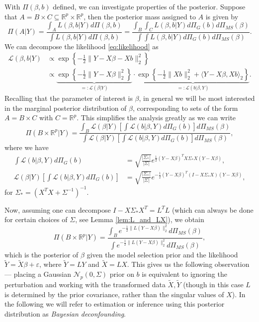 \documentclass[11pt]{article}
\newcommand{\eps}{\varepsilon}
\newcommand{\R}{\mathbb{R}}
\newcommand{\Pims}{\Pi_{MS}}
\newcommand{\Pig}{\Pi_{G}}
\newcommand{\Li}{\mathcal{L}}
\newcommand{\postCov}{\Sigma_*}
\numberwithin{equation}{section}
\begin{document}
With $\Pi(\beta, b)$ defined, we can investigate properties of the posterior. Suppose that $A = B \times C \subseteq \R^{p} \times \R^{p}$, then the posterior mass assigned to $A$ is given by
$$
\Pi(A | Y) = \frac{\int_A L(\beta, b | Y) d\Pi(\beta, b) }{\int L(\beta, b | Y) d\Pi(\beta, b)} = \frac{\int_B \int_C L(\beta, b | Y) d\Pig(b) d\Pims(\beta) }{\int \int L(\beta, b | Y) d\Pig(b) d\Pims(\beta)}.
$$
We can decompose the likelihood \eqref{eq:likelihood} as
\begin{align*}
 \Li (\beta, b | Y) &\propto \exp\left\{-\frac{1}{2}\|Y - X\beta - Xb\|_2^2\right\} \\
	&\propto \underbrace{\exp\left\{-\frac{1}{2}\|Y - X\beta \|_2^2\right\}}_{=: \Li(\beta | Y)}\cdot \underbrace{\exp\left\{-\frac{1}{2}\|Xb\|_2^2 + \langle Y - X\beta, Xb\rangle_2 \right\}}_{=: \Li(b | \beta, Y)}. 
\end{align*}
Recalling that the parameter of interest is $\beta$, in general we will be most interested in the marginal posterior distribution of $\beta$, corresponding to sets of the form $A = B \times C$ with $C = \R^p$. This simplifies the analysis greatly as we can write
$$
\Pi(B \times \R^p | Y) = \frac{\int_B \Li(\beta | Y)\left[\int \Li(b |\beta, Y) d\Pig(b)\right] d\Pims(\beta) }{\int \Li(\beta | Y)\left[\int \Li(b |\beta, Y) d\Pig(b)\right] d\Pims(\beta) },
$$
where we have
\begin{align*}
\int \Li(b |\beta, Y) d\Pig(b) &= \sqrt{\frac{|\postCov|}{|\Sigma|}} e^{\frac{1}{2}(Y - X\beta)^TX\postCov X(Y - X\beta)}, \\	
 \Li(\beta | Y)\left[\int \Li(b |\beta, Y) d\Pig(b)\right] &= \sqrt{\frac{|\postCov|}{|\Sigma|}} e^{-\frac{1}{2}(Y - X\beta)^T(I-X\postCov X)(Y - X\beta)},
\end{align*}
for 
$
\postCov = (X^TX + \Sigma^{-1})^{-1}.
$

 Now, assuming one can decompose $I - X\postCov X^T = L^TL$ (which can always be done for certain choices of $\Sigma$, see Lemma \ref{lem:L_and_LX}), we obtain
$$
\Pi(B \times \R^p | Y) = \frac{\int_B e^{-\frac{1}{2}\|L(Y - X\beta)\|_2^2} d\Pi_{MS}(\beta) }{\int e^{-\frac{1}{2}\|L(Y - X\beta)\|_2^2} d\Pi_{MS}(\beta)},
$$
which is the posterior of $\beta$ given the model selection prior and the likelihood $\tilde{Y} = \tilde{X}\beta + \eps$, where $\tilde{Y} = LY$ and $\tilde{X} = LX$. This gives us the following observation --- placing a Gaussian $\mathcal{N}_p(0, \Sigma)$ prior on $b$ is equivalent to ignoring the perturbation and working with the transformed data $\tilde{X}, \tilde{Y}$ (though in this case $L$ is determined by the prior covariance, rather than the singular values of $X$). In the following we will refer to estimation or inference using this posterior distribution as {\it Bayesian deconfounding}.
\end{document}
